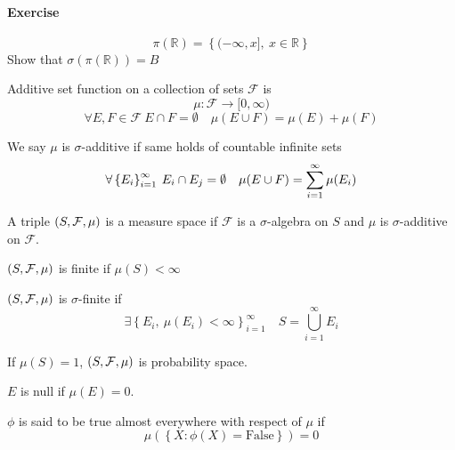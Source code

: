 \paragraph{Exercise}
$$\pi(\mathbb{R}) = \left\{ (-\infty, x], \: x\in \mathbb{R} \right\}$$
Show that $\sigma(\pi(\mathbb{R})) = B$

\begin{definition}
	Additive set function on a collection of sets $\mathcal{F}$ is
	$$\mu: \mathcal{F} \to [0, \infty)$$
	$$\forall E,F \in \mathcal{F} \: E\cap F = \emptyset \quad \mu(E\cup F) = \mu(E) +\mu(F) $$
	
	We say $\mu$ is $\sigma$-additive if same holds of countable infinite sets
	$$\forall \left\{ E_i \right\}_{i=1}^\infty \: E_i \cap E_j = \emptyset \quad \mu\qty(E\cup F) = \sum_{i=1}^\infty \mu(E_i)  $$
	
\end{definition}


\begin{definition}
	A triple $\qty(S, \mathcal{F}, \mu)$ is a measure space if $\mathcal{F}$ is a $\sigma$-algebra on $S$ and $\mu$ is $\sigma$-additive on $\mathcal{F}$.
	
\end{definition}


\begin{definition}
 $\qty(S, \mathcal{F}, \mu)$ is finite if $\mu(S) < \infty$
 
  $\qty(S, \mathcal{F}, \mu)$ is $\sigma$-finite if
	$$\exists \left\{ E_i, \: \mu(E_i)<\infty \right\}_{i=1}^\infty \quad S=\bigcup_{i=1}^\infty E_i$$
\end{definition}
\begin{definition}
If $\mu(S) =1$, $\qty(S, \mathcal{F}, \mu)$ is probability space.
\end{definition}

\begin{definition}
	$E$ is null if $\mu(E)=0$.
\end{definition}
\begin{definition}
	$\phi$ is said to be true almost everywhere with respect of $\mu$ if 
	$$\mu(\left\{ X : \phi(X) = \text{False} \right\}) = 0$$
\end{definition}

